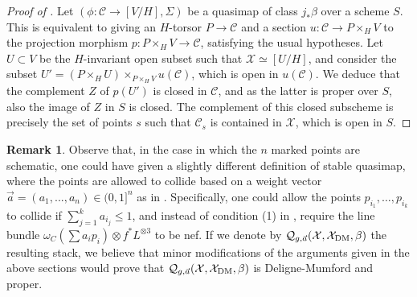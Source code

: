 \documentclass{amsart}
\newcommand{\sC}{\mathscr{C}}
\newcommand{\cQ}{\mathcal{Q}}
\newcommand{\cX}{\mathcal{X}}
\newcommand{\dm}{{\rm DM}}
\theoremstyle{definition}
\newtheorem{Remark}[theorem]{Remark}
\theoremstyle{definition}
\begin{document}
{\begin{proof}[Proof of ]
    Let $(\phi:\sC\to [V/H], \Sigma)$ be a quasimap of class $j_*\beta$ over a scheme $S$. This is equivalent to giving an $H$-torsor $P\to \sC$ and a section $u:\sC\to P\times_H V$ to the projection morphism $p:P\times_H V \to \sC$, satisfying the usual hypotheses. Let $U\subset V$ be the $H$-invariant open subset such that $\cX\simeq [U/H]$, and consider the subset $U'=(P\times_H U)\times_{P\times_H V} u(\sC)$, which is open in $u(\sC)$. We deduce that the complement $Z$ of $p(U')$ is closed in $\sC$, and as the latter is proper over $S$, also the image of $Z$ in $S$ is closed. The complement of this closed subscheme is precisely the set of points $s$ such that $\sC_s$ is contained in $\cX$, which is open in $S$.
    \end{proof}
\begin{Remark}\label{remark_weight_vector_case}
    Observe that, in the case in which the $n$ marked points are schematic, one could have given a slightly different definition of stable quasimap, where the points are allowed to collide based on a weight vector $\vec{a}=(a_1,...,a_n)\in (0,1]^n$ as in \cite{Hassett_w}. Specifically, one could allow the points $p_{i_1},\ldots ,p_{i_k}$ to collide if $\sum_{j=1}^ka_{i_j}\le 1$, and instead of condition (1) in , require the line bundle $\omega_C(\sum a_ip_i)\otimes f^*L^{\otimes 3}$ to be nef. If we denote by $\cQ_{g,\vec{a}}(\cX,\cX_\dm,\beta)$ the resulting stack, we believe that minor modifications of the arguments given in the above sections would prove that $\cQ_{g,\vec{a}}(\cX,\cX_\dm,\beta)$ is Deligne-Mumford and proper. \end{Remark}
}
\end{document}
